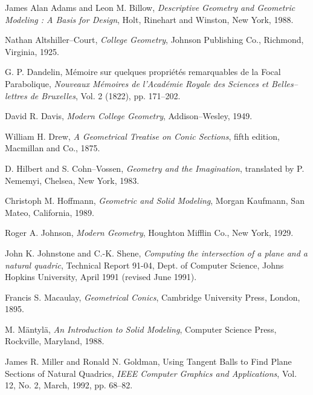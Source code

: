 \begin{thebibliography}{999}

     James Alan Adams and Leon M. Billow,
     {\em Descriptive Geometry and Geometric Modeling : A Basis for Design},
     Holt, Rinehart and Winston, New York, 1988.


     Nathan Altshiller--Court,
     {\em College Geometry},
     Johnson Publishing Co., Richmond, Virginia, 1925.

     G. P. Dandelin,
     M\'{e}moire sur quelques propri\'{e}t\'{e}s remarquables de la Focal
     Parabolique,
     {\em Nouveaux M\'{e}moires de l'Acad\'{e}mie Royale des Sciences et
     Belles--lettres de Bruxelles},
     Vol. 2 (1822), pp. 171--202.

     David R. Davis,
     {\em Modern College Geometry},
     Addison--Wesley, 1949.

     William H. Drew,
     {\em A Geometrical Treatise on Conic Sections},
     fifth edition,
     Macmillan and Co., 1875.

     D. Hilbert and S. Cohn--Vossen,
     {\em Geometry and the Imagination},
     translated by P. Nememyi,
     Chelsea, New York, 1983.

     Christoph M. Hoffmann,
     {\em Geometric and Solid Modeling},
     Morgan Kaufmann, San Mateo, California, 1989.

     Roger A. Johnson,
     {\em Modern Geometry},
     Houghton Mifflin Co., New York, 1929.

     John K. Johnstone and C.-K. Shene,
     {\em Computing the intersection of a plane and a natural quadric},
     Technical Report 91-04, Dept. of Computer Science, Johns Hopkins 
     University, April 1991 (revised June 1991).

     Francis S. Macaulay,
     {\em Geometrical Conics},
     Cambridge University Press, London, 1895.

     M. {M\"{a}ntyl\"{a}},
     {\em An Introduction to Solid Modeling},
     Computer Science Press, Rockville, Maryland, 1988.

     James R. Miller and Ronald N. Goldman,
     Using Tangent Balls to Find Plane Sections of Natural Quadrics,
     {\em IEEE Computer Graphics and Applications}, 
     Vol. 12, No. 2, March, 1992, pp. 68--82.


\end{thebibliography}
